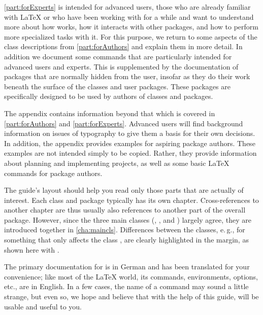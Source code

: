 \autoref{part:forExperts} is intended for advanced {\KOMAScript} users, those
who are already familiar with \LaTeX{} or who have been working with
{\KOMAScript} for a while and want to understand more about how {\KOMAScript}
works, how it interacts with other packages, and how to perform more
specialized tasks with it. For this purpose, we return to some aspects of the
class descriptions from \autoref{part:forAuthors} and explain them in more
detail. In addition we document some commands that are particularly intended
for advanced users and experts. This is supplemented by the documentation of
packages that are normally hidden from the user, insofar as they do their work
beneath the surface of the classes and user packages. These packages are
specifically designed to be used by authors of classes and packages.

The appendix
contains information beyond that which is covered in \autoref{part:forAuthors}
and \autoref{part:forExperts}. Advanced users will find background information
on issues of typography to give them a basis for their own decisions. In
addition, the appendix provides examples for aspiring package authors. These
examples are not intended simply to be copied. Rather, they provide
information about planning and implementing projects, as well as some basic
\LaTeX{} commands for package authors.

The guide's layout should help you read only those parts that are actually of
interest. Each class and package typically has its own chapter.
Cross-references to another chapter are thus usually also references to
another part of the overall package. However, since the three main classes
(, , and ) largely agree, they
are introduced together in \autoref{cha:maincls}. Differences between the
classes, e.\,g., for something that only affects the class
, are clearly highlighted in the
margin, as shown here with .

\begin{Explain}
  The primary documentation for {\KOMAScript} is in German and has been
  translated for your convenience; like most of the {\LaTeX} world, its
  commands, environments, options, etc., are in English. In a few cases, the
  name of a command may sound a little strange, but even so, we hope and
  believe that with the help of this guide, {\KOMAScript} will be usable
  and useful to you.
\end{Explain}

